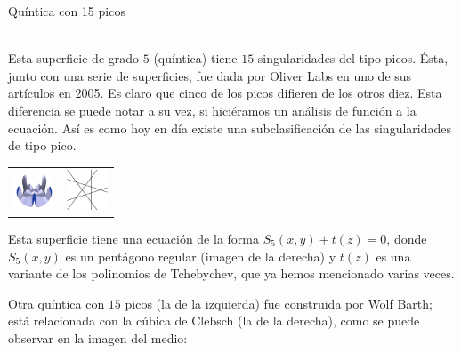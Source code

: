 \documentclass[es]{../../common/SurferDesc}%
\begin{document}
\footnotesize




\begin{surferPage}
  \begin{surferTitle} Quíntica con 15 picos\end{surferTitle}   \\
  Esta superficie de grado $5$ (quíntica) tiene $15$ singularidades del tipo picos.
  Ésta, junto con una serie de superficies, fue dada por Oliver Labs en uno de sus artículos en 2005.
  Es claro que cinco de los picos difieren de los otros diez. Esta diferencia se
  puede notar a su vez, si hiciéramos un análisis de función a la ecuación. Así es como hoy
  en día existe una subclasificación de las singularidades de tipo pico.
  
       \vspace*{-0.3em}
    \begin{center}
      \begin{tabular}{c@{\qquad}c}
        \includegraphics[height=1.2cm]{../../common/images/dessins_quint_15a2}
        &
        \includegraphics[height=1.2cm]{../../common/images/rp5.pdf}
      \end{tabular}
    \end{center}
    \vspace*{-0.3em}    
    
    Esta superficie tiene una ecuación de la forma
    $S_5(x,y) + t(z)=0$, donde $S_5(x,y)$ es un pentágono regular
    (imagen de la derecha) y $t(z)$ es una variante de los polinomios
    de Tchebychev, que ya hemos mencionado varias veces.
    
    Otra quíntica con $15$ picos (la de la izquierda) fue construida
    por Wolf Barth; está relacionada con la cúbica de Clebsch
    (la de la derecha), como se puede observar en la imagen del medio:


\end{surferPage}
\end{document}
